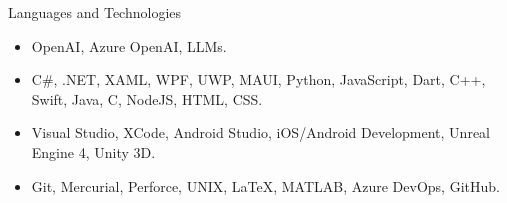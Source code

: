 \documentclass[]{mcdowellcv}
\begin{document}
	\begin{cvsection}{Languages and Technologies}
		\begin{cvsubsection}{}{}{}	
			\begin{itemize}
				\item OpenAI, Azure OpenAI, LLMs.
				\item C\#, .NET, XAML, WPF, UWP, MAUI, Python, JavaScript, Dart, C++, Swift, Java, C, NodeJS, HTML, CSS.
				\item Visual Studio, XCode, Android Studio, iOS/Android Development, Unreal Engine 4, Unity 3D.
				\item Git, Mercurial, Perforce, UNIX, LaTeX, MATLAB, Azure DevOps, GitHub.
			\end{itemize}
		\end{cvsubsection}
	\end{cvsection}
	
\end{document}
